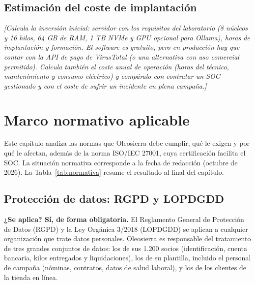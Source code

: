 \documentclass[11pt,a4paper,oneside]{report}
\newcommand{\guia}[1]{{\color{guia}\itshape[#1]}}
\begin{document}
\section{Estimación del coste de implantación}
\guia{Calcula la inversión inicial: servidor con los requisitos del laboratorio (8 núcleos y 16 hilos, 64 GB de RAM, 1 TB NVMe y GPU opcional para Ollama), horas de implantación y formación. El software es gratuito, pero en producción hay que contar con la API de pago de VirusTotal (o una alternativa con uso comercial permitido). Calcula también el coste anual de operación (horas del técnico, mantenimiento y consumo eléctrico) y compáralo con contratar un SOC gestionado y con el coste de sufrir un incidente en plena campaña.}

\chapter{Marco normativo aplicable}
\label{cap:normativa}

Este capítulo analiza las normas que Oleosierra debe cumplir, qué le exigen y por qué le afectan, además de la norma ISO/IEC 27001, cuya certificación facilita el SOC. La situación normativa corresponde a la fecha de redacción (octubre de 2026). La Tabla~\ref{tab:normativa} resume el resultado al final del capítulo.

\section{Protección de datos: RGPD y LOPDGDD}

\textbf{¿Se aplica? Sí, de forma obligatoria.} El Reglamento General de Protección de Datos (RGPD) y la Ley Orgánica 3/2018 (LOPDGDD) se aplican a cualquier organización que trate datos personales. Oleosierra es responsable del tratamiento de tres grandes conjuntos de datos: los de sus 1.200 socios (identificación, cuenta bancaria, kilos entregados y liquidaciones), los de su plantilla, incluido el personal de campaña (nóminas, contratos, datos de salud laboral), y los de los clientes de la tienda en línea.
\end{document}
